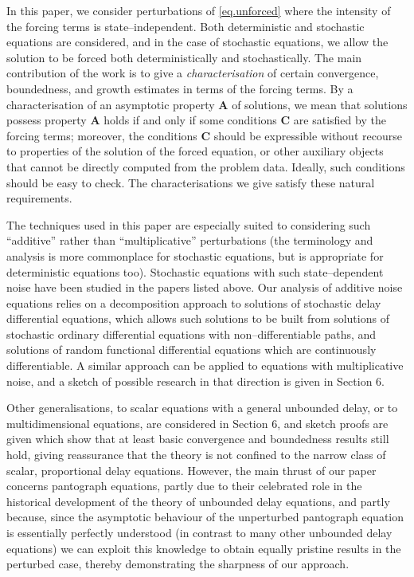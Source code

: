 \documentclass[a4paper,10pt,reqno]{amsart}
\numberwithin{equation}{section}
\theoremstyle{definition}
\theoremstyle{remark}
\DeclareMathOperator{\1}{\mathbbm 1}
\begin{document}
	In this paper, we consider perturbations of \eqref{eq.unforced} where the intensity of the forcing terms is state--independent. Both deterministic and stochastic equations are considered, and in the case of stochastic equations, we allow the solution to be forced both deterministically and stochastically. The main contribution of the work is to give a  \textit{characterisation} of certain convergence, boundedness, and growth estimates in terms of the forcing terms. By a  characterisation of an asymptotic property \textbf{A} of solutions, we mean that solutions possess property \textbf{A} holds if and only if some conditions \textbf{C} are satisfied by the forcing terms; moreover, the conditions \textbf{C} should be expressible without recourse to properties of the solution of the forced equation, or other auxiliary objects that cannot be directly computed from the problem data. Ideally, such conditions should be easy to check. The characterisations we give satisfy these natural requirements.   
	
	The techniques used in this paper are especially suited to considering such ``additive'' rather than ``multiplicative'' perturbations (the terminology and analysis is more commonplace for stochastic equations, but is appropriate for deterministic equations too). Stochastic equations with such state--dependent noise have been studied in the papers listed above. Our analysis of additive noise equations relies on  a decomposition approach to solutions of stochastic delay differential equations, which allows such solutions to be built from solutions of stochastic ordinary differential equations with non--differentiable paths, and solutions of random functional differential equations which are continuously differentiable. A similar approach can be applied to equations with multiplicative noise, and a sketch of possible research in that direction is given in Section 6.  
	
	Other generalisations, to scalar equations with a general unbounded delay, or to multidimensional equations, are considered in Section 6, and sketch proofs are given which show that at least basic convergence and boundedness results still hold, giving reassurance that the theory is not confined to the narrow class of scalar, proportional delay equations. However, the main thrust of our paper concerns pantograph equations, partly due to their celebrated role in the historical development of the theory of unbounded delay equations, and partly because, since the asymptotic behaviour of the unperturbed pantograph equation is essentially perfectly understood (in contrast to many other unbounded delay equations) we can exploit this knowledge to obtain equally pristine results in the perturbed case, thereby demonstrating the sharpness of our approach. 
	
\end{document}
